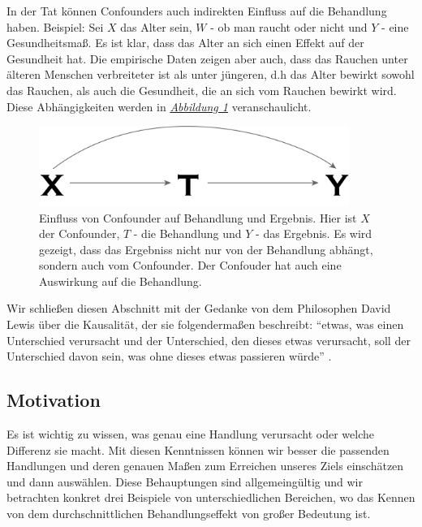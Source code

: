 \documentclass[12pt,a4paper,twoside]{scrartcl}
\numberwithin{equation}{section}
\newcommand{\reffig}[1]{\emph{\hyperref[#1]{Abbildung \ref*{#1}}}}
\begin{document}
\noindent
In der Tat können Confounders auch indirekten Einfluss auf die Behandlung haben. Beispiel: Sei $X$ das Alter sein, $W$ - ob man raucht oder nicht und $Y$ - eine Gesundheitsmaß. Es ist klar, dass das Alter an sich einen Effekt auf der Gesundheit hat. Die empirische Daten zeigen aber auch, dass das Rauchen unter älteren Menschen verbreiteter ist als unter jüngeren, d.h das Alter bewirkt sowohl das Rauchen, als auch die Gesundheit, die an sich vom Rauchen bewirkt wird. Diese Abhängigkeiten werden in \reffig{fig:confounder} veranschaulicht.\par   	
\begin{center}
  \vspace{6mm}
  \begin{figure}[h]
    \centering
    \includegraphics[height=0.4\textwidth, width=0.9\textwidth]{figures/confounder.png}
    \caption[Einfluss von Confounder auf Behandlung und Ergebnis]{Einfluss von Confounder auf Behandlung und Ergebnis. Hier ist $X$ der Confounder, $T$ - die Behandlung und $Y$ - das Ergebnis. Es wird gezeigt, dass das Ergebniss nicht nur von der Behandlung abhängt, sondern auch vom Confounder. Der Confouder hat auch eine Auswirkung auf die Behandlung.\cite{RebBar} }\label{fig:confounder}
  \end{figure}
\end{center}

\noindent
Wir schließen diesen Abschnitt mit der Gedanke von dem Philosophen David Lewis über die Kausalität, der sie folgendermaßen beschreibt: \enquote{etwas, was einen Unterschied verursacht und der Unterschied, den dieses etwas verursacht, soll der Unterschied  davon sein, was ohne dieses etwas passieren würde} \cite{lewis1974causation}.\par

\subsection{Motivation}\label{subsec:motivation}
Es ist wichtig zu wissen, was genau eine Handlung verursacht oder welche Differenz sie macht. Mit diesen Kenntnissen können wir besser die passenden Handlungen und deren genauen Maßen zum Erreichen unseres Ziels einschätzen und dann auswählen. Diese Behauptungen sind allgemeingültig und wir betrachten konkret drei Beispiele von unterschiedlichen Bereichen, wo das Kennen von dem durchschnittlichen Behandlungseffekt von großer Bedeutung ist.\par
\end{document}
